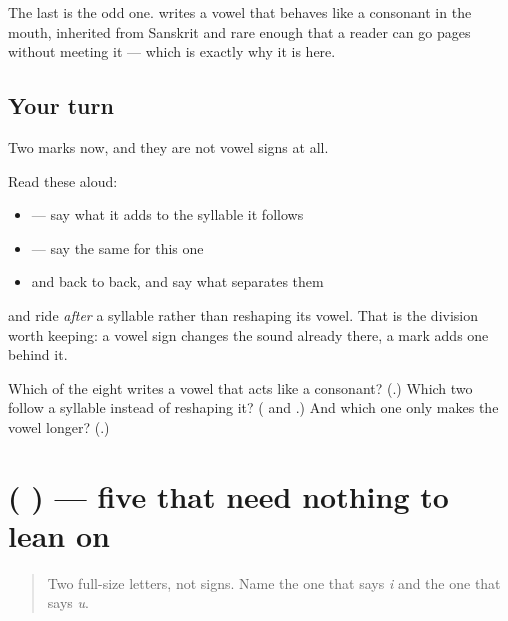 The last is the odd one. \textbf{} writes a vowel that behaves like a consonant in the mouth, inherited from Sanskrit and rare enough that a reader can go pages without meeting it — which is exactly why it is here.

\subsection*{Your turn}
Two marks now, and they are not vowel signs at all.

Read these aloud:

\begin{itemize}
\raggedright
  \item \textbf{} — say what it adds to the syllable it follows
  \item \textbf{} — say the same for this one
  \item \textbf{} and \textbf{} back to back, and say what separates them
\end{itemize}

\textbf{} and \textbf{} ride \emph{after} a syllable rather than reshaping its vowel. That is the division worth keeping: a vowel sign changes the sound already there, a mark adds one behind it.

\begin{tcolorbox}[breakable,colback=teal!4,colframe=teal!35!black,title={Before you move on}]
Which of the eight writes a vowel that acts like a consonant? (\textbf{}.) Which two follow a syllable instead of reshaping it? (\textbf{} and \textbf{}.) And which one only makes the vowel longer? (\textbf{}.)
\end{tcolorbox}
\section[\texorpdfstring{(\kn{ಇ} \kn{ಈ} \kn{ಉ} \kn{ಊ} \kn{ಓ})}{(ಇ ಈ ಉ ಊ ಓ)}]{(    ) — five that need nothing to lean on}

\label{lesson:KA-R81-vowels-that-stand}



\begin{quote}
Two full-size letters, not signs. Name the one that says \emph{i} and the one that says \emph{u}.
\end{quote}

